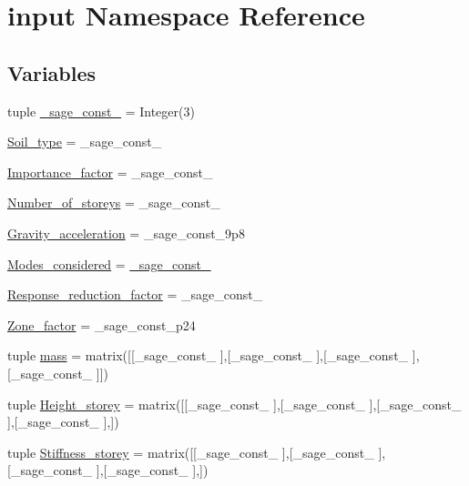\hypertarget{namespaceinput}{}\section{input Namespace Reference}
\label{namespaceinput}
\subsection*{Variables}
\begin{DoxyCompactItemize}
\item 
tuple \hyperlink{namespaceinput_a807fd6f7029374e2d9e918088f60bb88}{\+\_\+sage\+\_\+const\+\_} = Integer(3)
\item 
\hyperlink{namespaceinput_a6221ae01cf2fb9e8cd22204749785a0e}{Soil\+\_\+type} = \+\_\+sage\+\_\+const\+\_
\item 
\hyperlink{namespaceinput_a0840d963ea24db338f3ab4457defb494}{Importance\+\_\+factor} = \+\_\+sage\+\_\+const\+\_
\item 
\hyperlink{namespaceinput_a10237b312ba44e8c8090db86059c5803}{Number\+\_\+of\+\_\+storeys} = \+\_\+sage\+\_\+const\+\_
\item 
\hyperlink{namespaceinput_a55ab15c1c171513e99332aa50c723764}{Gravity\+\_\+acceleration} = \+\_\+sage\+\_\+const\+\_\+9p8
\item 
\hyperlink{namespaceinput_adb7aca4735796aaa4a46456d3edeac2e}{Modes\+\_\+considered} = \hyperlink{namespaceinput_a807fd6f7029374e2d9e918088f60bb88}{\+\_\+sage\+\_\+const\+\_}
\item 
\hyperlink{namespaceinput_aa6d0078a6d934c0d515d85059525e938}{Response\+\_\+reduction\+\_\+factor} = \+\_\+sage\+\_\+const\+\_
\item 
\hyperlink{namespaceinput_aeea70e58ec9bb0d3d6c4363867eb0f82}{Zone\+\_\+factor} = \+\_\+sage\+\_\+const\+\_\+p24
\item 
tuple \hyperlink{namespaceinput_af91e2c1a9ecd07a9c8dcf3a5fc8b2b60}{mass} = matrix(\mbox{[}\mbox{[}\+\_\+sage\+\_\+const\+\_ \mbox{]},\mbox{[}\+\_\+sage\+\_\+const\+\_ \mbox{]},\mbox{[}\+\_\+sage\+\_\+const\+\_ \mbox{]},\mbox{[}\+\_\+sage\+\_\+const\+\_ \mbox{]}\mbox{]})
\item 
tuple \hyperlink{namespaceinput_a01ad5b8730285b6aaebb2bc3f3fc0894}{Height\+\_\+storey} = matrix(\mbox{[}\mbox{[}\+\_\+sage\+\_\+const\+\_ \mbox{]},\mbox{[}\+\_\+sage\+\_\+const\+\_ \mbox{]},\mbox{[}\+\_\+sage\+\_\+const\+\_ \mbox{]},\mbox{[}\+\_\+sage\+\_\+const\+\_ \mbox{]},\mbox{]})
\item 
tuple \hyperlink{namespaceinput_a3853184afbe677b2a218690766c4f5e4}{Stiffness\+\_\+storey} = matrix(\mbox{[}\mbox{[}\+\_\+sage\+\_\+const\+\_ \mbox{]},\mbox{[}\+\_\+sage\+\_\+const\+\_ \mbox{]},\mbox{[}\+\_\+sage\+\_\+const\+\_ \mbox{]},\mbox{[}\+\_\+sage\+\_\+const\+\_ \mbox{]},\mbox{]})
\end{DoxyCompactItemize}


